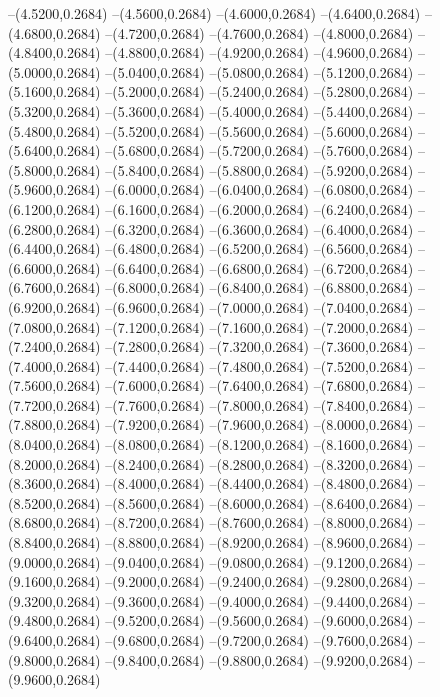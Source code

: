 {	--(4.5200,0.2684)
	--(4.5600,0.2684)
	--(4.6000,0.2684)
	--(4.6400,0.2684)
	--(4.6800,0.2684)
	--(4.7200,0.2684)
	--(4.7600,0.2684)
	--(4.8000,0.2684)
	--(4.8400,0.2684)
	--(4.8800,0.2684)
	--(4.9200,0.2684)
	--(4.9600,0.2684)
	--(5.0000,0.2684)
	--(5.0400,0.2684)
	--(5.0800,0.2684)
	--(5.1200,0.2684)
	--(5.1600,0.2684)
	--(5.2000,0.2684)
	--(5.2400,0.2684)
	--(5.2800,0.2684)
	--(5.3200,0.2684)
	--(5.3600,0.2684)
	--(5.4000,0.2684)
	--(5.4400,0.2684)
	--(5.4800,0.2684)
	--(5.5200,0.2684)
	--(5.5600,0.2684)
	--(5.6000,0.2684)
	--(5.6400,0.2684)
	--(5.6800,0.2684)
	--(5.7200,0.2684)
	--(5.7600,0.2684)
	--(5.8000,0.2684)
	--(5.8400,0.2684)
	--(5.8800,0.2684)
	--(5.9200,0.2684)
	--(5.9600,0.2684)
	--(6.0000,0.2684)
	--(6.0400,0.2684)
	--(6.0800,0.2684)
	--(6.1200,0.2684)
	--(6.1600,0.2684)
	--(6.2000,0.2684)
	--(6.2400,0.2684)
	--(6.2800,0.2684)
	--(6.3200,0.2684)
	--(6.3600,0.2684)
	--(6.4000,0.2684)
	--(6.4400,0.2684)
	--(6.4800,0.2684)
	--(6.5200,0.2684)
	--(6.5600,0.2684)
	--(6.6000,0.2684)
	--(6.6400,0.2684)
	--(6.6800,0.2684)
	--(6.7200,0.2684)
	--(6.7600,0.2684)
	--(6.8000,0.2684)
	--(6.8400,0.2684)
	--(6.8800,0.2684)
	--(6.9200,0.2684)
	--(6.9600,0.2684)
	--(7.0000,0.2684)
	--(7.0400,0.2684)
	--(7.0800,0.2684)
	--(7.1200,0.2684)
	--(7.1600,0.2684)
	--(7.2000,0.2684)
	--(7.2400,0.2684)
	--(7.2800,0.2684)
	--(7.3200,0.2684)
	--(7.3600,0.2684)
	--(7.4000,0.2684)
	--(7.4400,0.2684)
	--(7.4800,0.2684)
	--(7.5200,0.2684)
	--(7.5600,0.2684)
	--(7.6000,0.2684)
	--(7.6400,0.2684)
	--(7.6800,0.2684)
	--(7.7200,0.2684)
	--(7.7600,0.2684)
	--(7.8000,0.2684)
	--(7.8400,0.2684)
	--(7.8800,0.2684)
	--(7.9200,0.2684)
	--(7.9600,0.2684)
	--(8.0000,0.2684)
	--(8.0400,0.2684)
	--(8.0800,0.2684)
	--(8.1200,0.2684)
	--(8.1600,0.2684)
	--(8.2000,0.2684)
	--(8.2400,0.2684)
	--(8.2800,0.2684)
	--(8.3200,0.2684)
	--(8.3600,0.2684)
	--(8.4000,0.2684)
	--(8.4400,0.2684)
	--(8.4800,0.2684)
	--(8.5200,0.2684)
	--(8.5600,0.2684)
	--(8.6000,0.2684)
	--(8.6400,0.2684)
	--(8.6800,0.2684)
	--(8.7200,0.2684)
	--(8.7600,0.2684)
	--(8.8000,0.2684)
	--(8.8400,0.2684)
	--(8.8800,0.2684)
	--(8.9200,0.2684)
	--(8.9600,0.2684)
	--(9.0000,0.2684)
	--(9.0400,0.2684)
	--(9.0800,0.2684)
	--(9.1200,0.2684)
	--(9.1600,0.2684)
	--(9.2000,0.2684)
	--(9.2400,0.2684)
	--(9.2800,0.2684)
	--(9.3200,0.2684)
	--(9.3600,0.2684)
	--(9.4000,0.2684)
	--(9.4400,0.2684)
	--(9.4800,0.2684)
	--(9.5200,0.2684)
	--(9.5600,0.2684)
	--(9.6000,0.2684)
	--(9.6400,0.2684)
	--(9.6800,0.2684)
	--(9.7200,0.2684)
	--(9.7600,0.2684)
	--(9.8000,0.2684)
	--(9.8400,0.2684)
	--(9.8800,0.2684)
	--(9.9200,0.2684)
	--(9.9600,0.2684)
}
